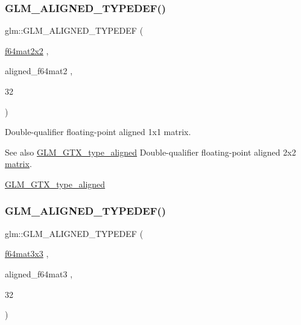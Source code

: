 \subsubsection{\texorpdfstring{G\+L\+M\+\_\+\+A\+L\+I\+G\+N\+E\+D\+\_\+\+T\+Y\+P\+E\+D\+E\+F()}{GLM\_ALIGNED\_TYPEDEF()}\hspace{0.1cm}{\footnotesize\ttfamily [193/209]}}
{\footnotesize\ttfamily glm\+::\+G\+L\+M\+\_\+\+A\+L\+I\+G\+N\+E\+D\+\_\+\+T\+Y\+P\+E\+D\+EF (\begin{DoxyParamCaption}\item[{\hyperlink{group__gtc__type__precision_gae18de078e2885803ceda215c6e04a08a}{f64mat2x2}}]{,  }\item[{aligned\+\_\+f64mat2}]{,  }\item[{32}]{ }\end{DoxyParamCaption})}

Double-\/qualifier floating-\/point aligned 1x1 matrix. \begin{DoxySeeAlso}{See also}
\hyperlink{group__gtx__type__aligned}{G\+L\+M\+\_\+\+G\+T\+X\+\_\+type\+\_\+aligned} Double-\/qualifier floating-\/point aligned 2x2 \hyperlink{_s_d_l__opengl__glext_8h_a7b24a3f2f56eb1244ae69dacb4fecb6f}{matrix}. 

\hyperlink{group__gtx__type__aligned}{G\+L\+M\+\_\+\+G\+T\+X\+\_\+type\+\_\+aligned} 
\end{DoxySeeAlso}
\mbox{\label{group__gtx__type__aligned_gaae8e4639c991e64754145ab8e4c32083}} 
\subsubsection{\texorpdfstring{G\+L\+M\+\_\+\+A\+L\+I\+G\+N\+E\+D\+\_\+\+T\+Y\+P\+E\+D\+E\+F()}{GLM\_ALIGNED\_TYPEDEF()}\hspace{0.1cm}{\footnotesize\ttfamily [194/209]}}
{\footnotesize\ttfamily glm\+::\+G\+L\+M\+\_\+\+A\+L\+I\+G\+N\+E\+D\+\_\+\+T\+Y\+P\+E\+D\+EF (\begin{DoxyParamCaption}\item[{\hyperlink{group__gtc__type__precision_ga3b494201796c4200886e59f9695ecff0}{f64mat3x3}}]{,  }\item[{aligned\+\_\+f64mat3}]{,  }\item[{32}]{ }\end{DoxyParamCaption})}

